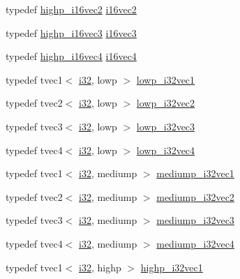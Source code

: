 \begin{DoxyCompactItemize}
typedef \hyperlink{namespaceglm_a9a46126d0bf9ceb121df6109ac8da717}{highp\+\_\+i16vec2} \hyperlink{group__gtc__type__precision_ga37af364ff13fb791571dd324dfd3ca89}{i16vec2}
\item 
typedef \hyperlink{namespaceglm_a197812ee8b57e9c7b4fca157443426a1}{highp\+\_\+i16vec3} \hyperlink{group__gtc__type__precision_ga85e903f028d903b416a1119b00af57ea}{i16vec3}
\item 
typedef \hyperlink{namespaceglm_a08c1756ac7347ffb0aaa2eba3c200e1e}{highp\+\_\+i16vec4} \hyperlink{group__gtc__type__precision_gaf074450c0e60b45114084b1df4012a1d}{i16vec4}
\item 
typedef tvec1$<$ \hyperlink{group__gtc__type__precision_ga1d8ed5c43e91ea7d4528389da4fa9524}{i32}, lowp $>$ \hyperlink{namespaceglm_af3b9729c4b7d505368fd4ae20424b6d3}{lowp\+\_\+i32vec1}
\item 
typedef tvec2$<$ \hyperlink{group__gtc__type__precision_ga1d8ed5c43e91ea7d4528389da4fa9524}{i32}, lowp $>$ \hyperlink{namespaceglm_a9212b569bc55c19da61025470e90a906}{lowp\+\_\+i32vec2}
\item 
typedef tvec3$<$ \hyperlink{group__gtc__type__precision_ga1d8ed5c43e91ea7d4528389da4fa9524}{i32}, lowp $>$ \hyperlink{namespaceglm_a9c9cf334ddb9af22d2b46ba718db1391}{lowp\+\_\+i32vec3}
\item 
typedef tvec4$<$ \hyperlink{group__gtc__type__precision_ga1d8ed5c43e91ea7d4528389da4fa9524}{i32}, lowp $>$ \hyperlink{namespaceglm_adf58b40a2a5c28c72dc8171e8e204499}{lowp\+\_\+i32vec4}
\item 
typedef tvec1$<$ \hyperlink{group__gtc__type__precision_ga1d8ed5c43e91ea7d4528389da4fa9524}{i32}, mediump $>$ \hyperlink{namespaceglm_aceff016e1d5692bf47b84cd0e3e80289}{mediump\+\_\+i32vec1}
\item 
typedef tvec2$<$ \hyperlink{group__gtc__type__precision_ga1d8ed5c43e91ea7d4528389da4fa9524}{i32}, mediump $>$ \hyperlink{namespaceglm_a7340c2a0bb4cef81a39af043b5604054}{mediump\+\_\+i32vec2}
\item 
typedef tvec3$<$ \hyperlink{group__gtc__type__precision_ga1d8ed5c43e91ea7d4528389da4fa9524}{i32}, mediump $>$ \hyperlink{namespaceglm_a67adf4d9792c7c62838f62ad1116f80b}{mediump\+\_\+i32vec3}
\item 
typedef tvec4$<$ \hyperlink{group__gtc__type__precision_ga1d8ed5c43e91ea7d4528389da4fa9524}{i32}, mediump $>$ \hyperlink{namespaceglm_a574b78e832855a2326c874aec67b05dd}{mediump\+\_\+i32vec4}
\item 
typedef tvec1$<$ \hyperlink{group__gtc__type__precision_ga1d8ed5c43e91ea7d4528389da4fa9524}{i32}, highp $>$ \hyperlink{namespaceglm_ad38568f19fc1dac06f1f3478689caf0e}{highp\+\_\+i32vec1}

\end{DoxyCompactItemize}
